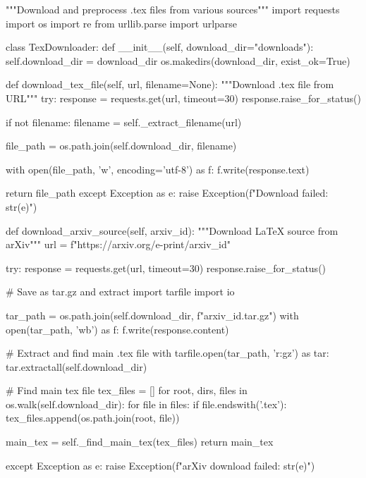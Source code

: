 """Download and preprocess .tex files from various sources"""
import requests
import os
import re
from urllib.parse import urlparse

class TexDownloader:
    def __init__(self, download_dir="downloads"):
        self.download_dir = download_dir
        os.makedirs(download_dir, exist_ok=True)
    
    def download_tex_file(self, url, filename=None):
        """Download .tex file from URL"""
        try:
            response = requests.get(url, timeout=30)
            response.raise_for_status()
            
            if not filename:
                filename = self._extract_filename(url)
            
            file_path = os.path.join(self.download_dir, filename)
            
            with open(file_path, 'w', encoding='utf-8') as f:
                f.write(response.text)
            
            return file_path
        except Exception as e:
            raise Exception(f"Download failed: {str(e)}")
    
    def download_arxiv_source(self, arxiv_id):
        """Download LaTeX source from arXiv"""
        url = f"https://arxiv.org/e-print/{arxiv_id}"
        
        try:
            response = requests.get(url, timeout=30)
            response.raise_for_status()
            
            # Save as tar.gz and extract
            import tarfile
            import io
            
            tar_path = os.path.join(self.download_dir, f"{arxiv_id}.tar.gz")
            with open(tar_path, 'wb') as f:
                f.write(response.content)
            
            # Extract and find main .tex file
            with tarfile.open(tar_path, 'r:gz') as tar:
                tar.extractall(self.download_dir)
            
            # Find main tex file
            tex_files = []
            for root, dirs, files in os.walk(self.download_dir):
                for file in files:
                    if file.endswith('.tex'):
                        tex_files.append(os.path.join(root, file))
            
            main_tex = self._find_main_tex(tex_files)
            return main_tex
            
        except Exception as e:
            raise Exception(f"arXiv download failed: {str(e)}")
    
